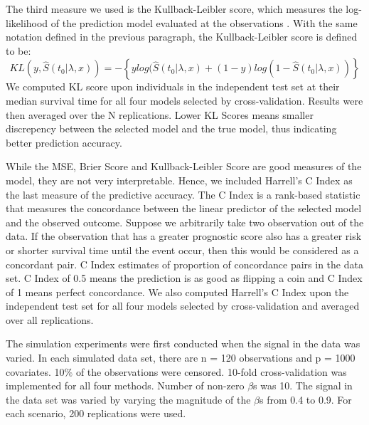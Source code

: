 \par The third measure we used is the Kullback-Leibler score, which measures the log-likelihood of the prediction model evaluated at the observations \citep{VanHouwelingen2011}. With the same notation defined in the previous paragraph, the Kullback-Leibler score is defined to be:
\begin{equation}
	KL(y, \hat{S}(t_0|\lambda,x)) = -\left\{ ylog(\hat{S}(t_0|\lambda,x) + (1 - y)log(1 - \hat{S}(t_0|\lambda,x)) \right\}
\end{equation}
We computed KL score upon individuals in the independent test set at their median survival time for all four models selected by cross-validation. Results were then averaged over the N replications. Lower KL Scores means smaller discrepency between the selected model and the true model, thus indicating better prediction accuracy.

\par While the MSE, Brier Score and Kullback-Leibler Score are good measures of the model, they are not very interpretable. Hence, we included Harrell's C Index as the last measure of the predictive accuracy\citep{HarrellJr1984}. The C Index is a rank-based statistic that measures the concordance between the linear predictor of the selected model and the observed outcome. Suppose we arbitrarily take two observation out of the data. If the observation that has a greater prognostic score also has a greater risk or shorter survival time until the event occur, then this would be considered as a concordant pair. C Index estimates of proportion of concordance pairs in the data set. C Index of 0.5 means the prediction is as good as flipping a coin and C Index of 1 means perfect concordance. We also computed Harrell's C Index upon the independent test set for all four models selected by cross-validation and averaged over all replications.

The simulation experiments were first conducted when the signal in the data was varied. In each simulated data set, there are n = 120 observations and p = 1000 covariates. 10$\%$ of the observations were censored. 10-fold cross-validation was implemented for all four methods. Number of non-zero $\beta$s was 10. The signal in the data set was varied by varying the magnitude of the $\beta$s from 0.4 to 0.9. For each scenario, 200 replications were used. 
   
